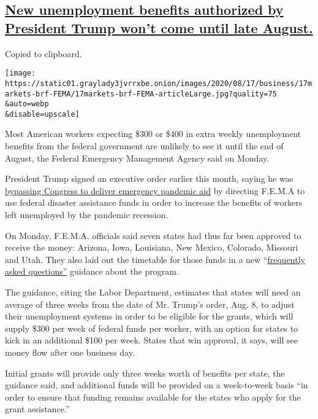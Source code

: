 \hypertarget{new-unemployment-benefits-authorized-by-president-trump-wont-come-until-late-august}{%
\subsection{\texorpdfstring{\protect\hyperlink{new-unemployment-benefits-authorized-by-president-trump-wont-come-until-late-august}{New
unemployment benefits authorized by President Trump won't come until
late
August.}}{New unemployment benefits authorized by President Trump won't come until late August.}}\label{new-unemployment-benefits-authorized-by-president-trump-wont-come-until-late-august}}

Copied to clipboard.

\texttt{[image: https://static01.graylady3jvrrxbe.onion/images/2020/08/17/business/17markets-brf-FEMA/17markets-brf-FEMA-articleLarge.jpg?quality=75\\\&auto=webp\\\&disable=upscale]}

Most American workers expecting \$300 or \$400 in extra weekly
unemployment benefits from the federal government are unlikely to see it
until the end of August, the Federal Emergency Management Agency said on
Monday.

President Trump signed an executive order earlier this month, saying he
was
\href{https://www.nytimes3xbfgragh.onion/2020/08/08/us/politics/trump-stimulus-bill-coronavirus.html}{bypassing
Congress to deliver emergency pandemic aid} by directing F.E.M.A to use
federal disaster assistance funds in order to increase the benefits of
workers left unemployed by the pandemic recession.

On Monday, F.E.M.A. officials said seven states had thus far been
approved to receive the money: Arizona, Iowa, Louisiana, New Mexico,
Colorado, Missouri and Utah. They also laid out the timetable for those
funds in a new
``\href{https://www.fema.gov/sites/default/files/2020-08/fema_supplement-lost-wages-payments-under-other-needs-assistance_faq_0.pdf}{frequently
asked questions''} guidance about the program.

The guidance, citing the Labor Department, estimates that states will
need an average of three weeks from the date of Mr. Trump's order, Aug.
8, to adjust their unemployment systems in order to be eligible for the
grants, which will supply \$300 per week of federal funds per worker,
with an option for states to kick in an additional \$100 per week.
States that win approval, it says, will see money flow after one
business day.

Initial grants will provide only three weeks worth of benefits per
state, the guidance said, and additional funds will be provided on a
week-to-week basis ``in order to ensure that funding remains available
for the states who apply for the grant assistance.''


